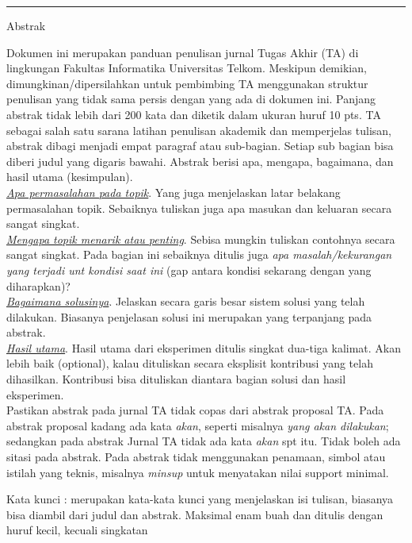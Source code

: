 {\bf \parindent0pt \noindent\rule{\textwidth}{1pt}
Abstrak

Dokumen ini merupakan panduan penulisan jurnal Tugas Akhir (TA) di lingkungan Fakultas Informatika Universitas Telkom. Meskipun demikian, dimungkinan/dipersilahkan untuk pembimbing TA menggunakan struktur penulisan yang tidak sama persis dengan yang ada di dokumen ini. Panjang abstrak tidak lebih dari 200 kata dan diketik dalam ukuran huruf 10 pts. TA sebagai salah satu sarana latihan penulisan akademik dan memperjelas tulisan, abstrak dibagi menjadi empat paragraf atau sub-bagian. Setiap sub bagian bisa diberi judul yang digaris bawahi. Abstrak berisi apa, mengapa, bagaimana, dan hasil utama (kesimpulan).\\

\underline{\textit{Apa permasalahan pada topik}}. Yang juga menjelaskan latar belakang permasalahan topik. Sebaiknya tuliskan juga apa masukan dan keluaran secara sangat singkat. \\

\underline{\textit{Mengapa topik menarik atau penting}}. Sebisa mungkin tuliskan contohnya secara sangat singkat. Pada bagian ini sebaiknya ditulis juga \textit{apa masalah/kekurangan yang terjadi unt kondisi saat ini} (gap antara kondisi sekarang dengan yang diharapkan)? \\

\underline{\textit{Bagaimana solusinya}}. Jelaskan secara garis besar sistem solusi yang telah dilakukan. Biasanya penjelasan solusi ini merupakan yang terpanjang pada abstrak. \\

\underline{\textit{Hasil utama}}. Hasil utama dari eksperimen ditulis singkat dua-tiga kalimat. Akan lebih baik (optional), kalau dituliskan secara eksplisit kontribusi yang telah dihasilkan. Kontribusi bisa dituliskan diantara bagian solusi dan hasil eksperimen. \\

Pastikan abstrak pada jurnal TA tidak copas dari abstrak proposal TA. Pada abstrak proposal kadang ada kata \textit{akan}, seperti misalnya \textit{yang akan dilakukan}; sedangkan pada abstrak Jurnal TA tidak ada kata \textit{akan} spt itu. Tidak boleh ada sitasi pada abstrak. Pada abstrak tidak menggunakan penamaan, simbol atau istilah yang teknis, misalnya \textit{minsup} untuk menyatakan nilai support minimal.

 \bigskip
Kata kunci : merupakan kata-kata kunci yang menjelaskan isi tulisan, biasanya bisa diambil dari judul dan abstrak. Maksimal enam buah dan ditulis dengan huruf kecil, kecuali singkatan



}

